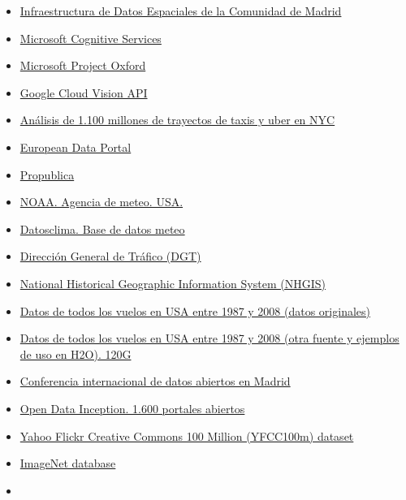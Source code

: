 \documentclass[]{article}
\begin{document}
\begin{itemize}
{  de Datos Espaciales de España}
\item
  \href{http://www.madrid.org/cartografia/idem/html/web/index.htm}{Infraestructura
  de Datos Espaciales de la Comunidad de Madrid}
\item
  \href{https://www.microsoft.com/cognitive-services/}{Microsoft
  Cognitive Services}
\item
  \href{https://www.projectoxford.ai/}{Microsoft Project Oxford}
\item
  \href{https://cloud.google.com/vision/}{Google Cloud Vision API}
\item
  \href{https://github.com/toddwschneider/nyc-taxi-data}{Análisis de
  1.100 millones de trayectos de taxis y uber en NYC}
\item
  \href{http://www.europeandataportal.eu/}{European Data Portal}
\item
  \href{https://www.propublica.org/data/}{Propublica}
\item
  \href{http://www.nesdis.noaa.gov/index.html}{NOAA. Agencia de meteo.
  USA.}
\item
  \href{http://datosclima.es/Aemet2013/DescargaDatos.html}{Datosclima.
  Base de datos meteo}
\item
  \href{https://sedeapl.dgt.gob.es/WEB_IEST_CONSULTA/inicio.faces}{Dirección
  General de Tráfico (DGT)}
\item
  \href{https://www.nhgis.org/}{National Historical Geographic
  Information System (NHGIS)}
\item
  \href{http://stat-computing.org/dataexpo/2009/the-data.html}{Datos de
  todos los vuelos en USA entre 1987 y 2008 (datos originales)}
\item
  \href{https://github.com/h2oai/h2o-2/wiki/Hacking-Airline-DataSet-with-H2O}{Datos
  de todos los vuelos en USA entre 1987 y 2008 (otra fuente y ejemplos
  de uso en H2O). 120G}
\item
  \href{http://opendatacon.org/}{Conferencia internacional de datos
  abiertos en Madrid}
\item
  \href{http://wwwhatsnew.com/2016/03/19/open-data-inception-recopilacion-de-1600-portales-de-datos-abiertos/?utm_content=buffer4e4d4\&utm_medium=social\&utm_source=linkedin.com\&utm_campaign=buffer}{Open
  Data Inception. 1.600 portales abiertos}
\item
  \href{http://yfcc100m.appspot.com/}{Yahoo Flickr Creative Commons 100
  Million (YFCC100m) dataset}
\item
  \href{http://www.image-net.org/}{ImageNet database}
\item

\end{itemize}
\end{document}
